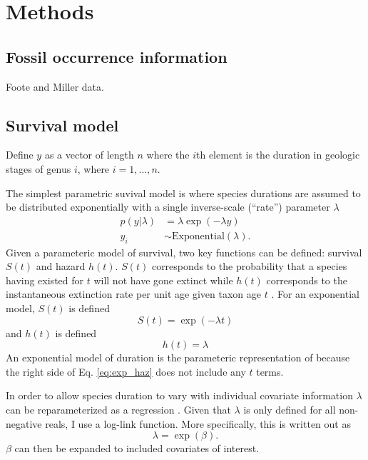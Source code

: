 \documentclass[12pt,letterpaper]{article}
\begin{document}
\section{Methods}

\subsection{Fossil occurrence information}
Foote and Miller data.


\subsection{Survival model}
Define \(y\) as a vector of length \(n\) where the \(i\)th element is the duration in geologic stages of genus \(i\), where \(i = 1, \dots, n\).

The simplest parametric suvival model is where species durations are assumed to be distributed exponentially with a single inverse-scale (``rate'') parameter \(\lambda\)
\begin{equation}
  \begin{aligned}
    p(y | \lambda) &= \lambda \exp(-\lambda y) \nonumber \\
    y_{i} &\sim \mathrm{Exponential}(\lambda).
  \end{aligned}
  \label{eq:exp}
\end{equation}
Given a parameteric model of survival, two key functions can be defined: survival \(S(t)\) and hazard \(h(t)\). \(S(t)\) corresponds to the probability that a species having existed for \(t\) will not have gone extinct while \(h(t)\) corresponds to the instantaneous extinction rate per unit age given taxon age \(t\) \citep{Klein2003}. For an exponential model, \(S(t)\) is defined
\begin{equation}
  S(t) = \exp(-\lambda t)
  \label{eq:exp_surv}
\end{equation}
and \(h(t)\) is defined
\begin{equation}
  h(t) = \lambda
  \label{eq:exp_haz}
\end{equation}
An exponential model of duration is the parameteric representation of \citet{VanValen1973} because the right side of Eq. \ref{eq:exp_haz} does not include any \(t\) terms.

In order to allow species duration to vary with individual covariate information \(\lambda\) can be reparameterized as a regression \citep{Klein2003}. Given that \(\lambda\) is only defined for all non-negative reals, I use a log-link function. More specifically, this is written out as 
\begin{equation}
  \lambda = \exp(\beta).
  \label{eq:lambda}
\end{equation}
\(\beta\) can then be expanded to included covariates of interest.
\end{document}
